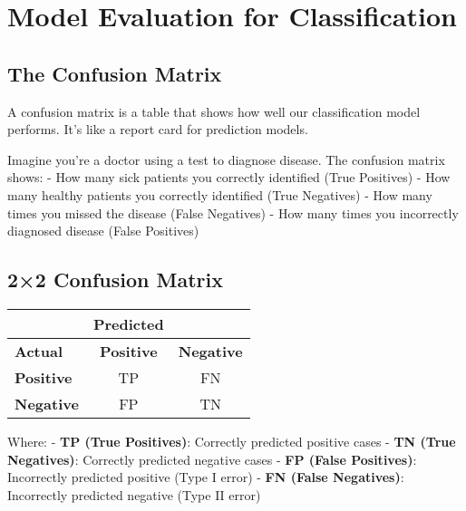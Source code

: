 \documentclass[
  11pt,
  letterpaper,
  oneside]{book}
\begin{document}
\section{Model Evaluation for
Classification}\label{model-evaluation-for-classification}

\subsection{The Confusion Matrix}\label{the-confusion-matrix}

A confusion matrix is a table that shows how well our classification
model performs. It's like a report card for prediction models.

\begin{tcolorbox}[enhanced jigsaw, toprule=.15mm, left=2mm, opacitybacktitle=0.6, colframe=quarto-callout-note-color-frame, leftrule=.75mm, titlerule=0mm, coltitle=black, colbacktitle=quarto-callout-note-color!10!white, toptitle=1mm, title=\textcolor{quarto-callout-note-color}{\faInfo}\hspace{0.5em}{Think of it this way}, bottomtitle=1mm, arc=.35mm, rightrule=.15mm, bottomrule=.15mm, breakable, opacityback=0, colback=white]

Imagine you're a doctor using a test to diagnose disease. The confusion
matrix shows: - How many sick patients you correctly identified (True
Positives) - How many healthy patients you correctly identified (True
Negatives) - How many times you missed the disease (False Negatives) -
How many times you incorrectly diagnosed disease (False Positives)

\end{tcolorbox}

\subsection{2×2 Confusion Matrix}\label{confusion-matrix}

\begin{longtable}[]{@{}lcc@{}}
\toprule\noalign{}
& \textbf{Predicted} & \\
\midrule\noalign{}
\endhead
\bottomrule\noalign{}
\endlastfoot
\textbf{Actual} & \textbf{Positive} & \textbf{Negative} \\
\textbf{Positive} & TP & FN \\
\textbf{Negative} & FP & TN \\
\end{longtable}

Where: - \textbf{TP (True Positives)}: Correctly predicted positive
cases - \textbf{TN (True Negatives)}: Correctly predicted negative cases
- \textbf{FP (False Positives)}: Incorrectly predicted positive (Type I
error) - \textbf{FN (False Negatives)}: Incorrectly predicted negative
(Type II error)
\end{document}
